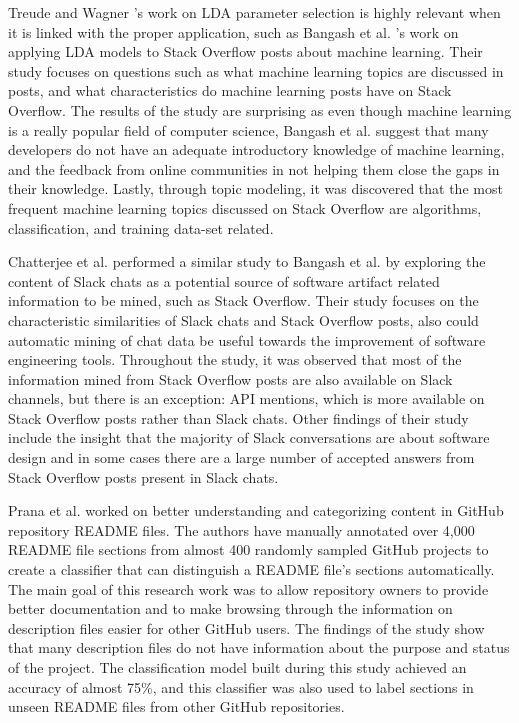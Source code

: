          Treude and Wagner \cite{treude2019predicting}'s work on LDA parameter selection is highly relevant when it is linked with the proper application, such as Bangash et al. \cite{bangash2019developers}'s work on applying LDA models to Stack Overflow posts about machine learning. Their study focuses on questions such as what machine learning topics are discussed in posts, and what characteristics do machine learning posts have on Stack Overflow. The results of the study are surprising as even though machine learning is a really popular field of computer science, Bangash et al. suggest that many developers do not have an adequate introductory knowledge of machine learning, and the feedback from online communities in not helping them close the gaps in their knowledge. Lastly, through topic modeling, it was discovered that the most frequent machine learning topics discussed on Stack Overflow are algorithms, classification, and training data-set related.
         
        Chatterjee et al. \cite{chatterjee2019exploratory} performed a similar study to Bangash et al. \cite{bangash2019developers} by exploring the content of Slack chats as a potential source of software artifact related information to be mined, such as Stack Overflow. Their study focuses on the characteristic similarities of Slack chats and Stack Overflow posts, also could automatic mining of chat data be useful towards the improvement of software engineering tools. Throughout the study, it was observed that most of the information mined from Stack Overflow posts are also available on Slack channels, but there is an exception: API mentions, which is more available on Stack Overflow posts rather than Slack chats. Other findings of their study include the insight that the majority of Slack conversations are about software design and in some cases there are a large number of accepted answers from Stack Overflow posts present in Slack chats.
         
        Prana et al. \cite{prana2019categorizing} worked on better understanding and categorizing content in GitHub repository README files. The authors have manually annotated over 4,000 README file sections from almost 400 randomly sampled GitHub projects to create a classifier that can distinguish a README file's sections automatically. The main goal of this research work was to allow repository owners to provide better documentation and to make browsing through the information on description files easier for other GitHub users. The findings of the study show that many description files do not have information about the purpose and status of the project. The classification model built during this study achieved an accuracy of almost 75\%, and this classifier was also used to label sections in unseen README files from other GitHub repositories.

